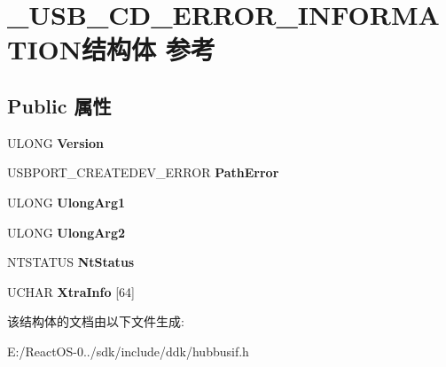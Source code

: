 \hypertarget{struct___u_s_b___c_d___e_r_r_o_r___i_n_f_o_r_m_a_t_i_o_n}{}\section{\+\_\+\+U\+S\+B\+\_\+\+C\+D\+\_\+\+E\+R\+R\+O\+R\+\_\+\+I\+N\+F\+O\+R\+M\+A\+T\+I\+O\+N结构体 参考}
\label{struct___u_s_b___c_d___e_r_r_o_r___i_n_f_o_r_m_a_t_i_o_n}
\subsection*{Public 属性}
\begin{DoxyCompactItemize}
\item 
\mbox{\label{struct___u_s_b___c_d___e_r_r_o_r___i_n_f_o_r_m_a_t_i_o_n_a65c68d43eef589744540a391d1f6ea11}} 
U\+L\+O\+NG {\bfseries Version}
\item 
\mbox{\label{struct___u_s_b___c_d___e_r_r_o_r___i_n_f_o_r_m_a_t_i_o_n_afb43ea62795822d0fb3d771cf2be5cb3}} 
U\+S\+B\+P\+O\+R\+T\+\_\+\+C\+R\+E\+A\+T\+E\+D\+E\+V\+\_\+\+E\+R\+R\+OR {\bfseries Path\+Error}
\item 
\mbox{\label{struct___u_s_b___c_d___e_r_r_o_r___i_n_f_o_r_m_a_t_i_o_n_a1acbbea3a2ab7b3f84c6a6a4c10e0b97}} 
U\+L\+O\+NG {\bfseries Ulong\+Arg1}
\item 
\mbox{\label{struct___u_s_b___c_d___e_r_r_o_r___i_n_f_o_r_m_a_t_i_o_n_aa449d8ad9b19c25de030004ebf7676ba}} 
U\+L\+O\+NG {\bfseries Ulong\+Arg2}
\item 
\mbox{\label{struct___u_s_b___c_d___e_r_r_o_r___i_n_f_o_r_m_a_t_i_o_n_a3f136977f94b978a91e1d36ad228c1e5}} 
N\+T\+S\+T\+A\+T\+US {\bfseries Nt\+Status}
\item 
\mbox{\label{struct___u_s_b___c_d___e_r_r_o_r___i_n_f_o_r_m_a_t_i_o_n_afa52169702b6b8daed525bbc45070741}} 
U\+C\+H\+AR {\bfseries Xtra\+Info} \mbox{[}64\mbox{]}
\end{DoxyCompactItemize}


该结构体的文档由以下文件生成\+:\begin{DoxyCompactItemize}
\item 
E\+:/\+React\+O\+S-\/0../sdk/include/ddk/hubbusif.\+h\end{DoxyCompactItemize}
